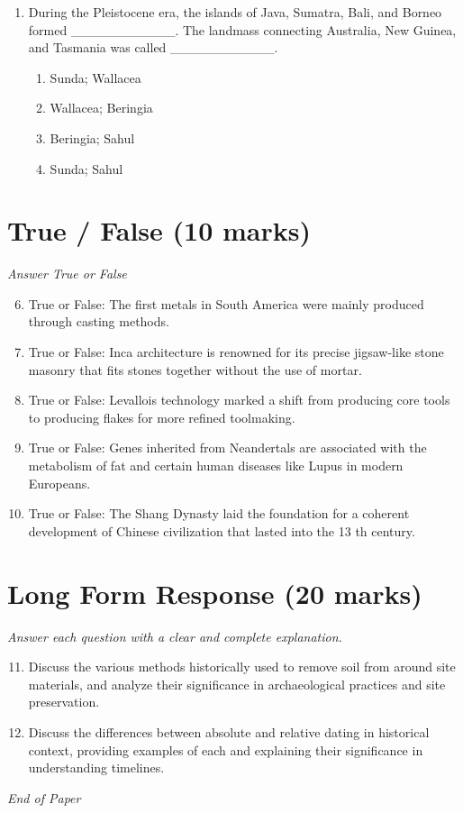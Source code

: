 \documentclass[12pt]{article}
\begin{document}
\begin{enumerate}[label=\arabic*.]
\begin{enumerate}[label=(\alph*)]
    \item 600,000 to 30,000 years ago.
    \item 400,000 to 10,000 years ago.
    \item 100,000 to 10,000 years ago.
\end{enumerate}
\item During the Pleistocene era, the islands of Java, Sumatra, Bali, and Borneo formed \_\_\_\_\_\_\_\_\_\_\_. The landmass connecting Australia, New Guinea, and Tasmania was called \_\_\_\_\_\_\_\_\_\_\_.
\begin{enumerate}[label=(\alph*)]
    \item Sunda; Wallacea
    \item Wallacea; Beringia
    \item Beringia; Sahul
    \item Sunda; Sahul
\end{enumerate}
\end{enumerate}

\section*{True / False (10 marks)}
\textit{Answer True or False}
\begin{enumerate}[label=\arabic*.]
\setcounter{enumi}{5}
\item True or False: The first metals in South America were mainly produced through casting methods.
\item True or False: Inca architecture is renowned for its precise jigsaw-like stone masonry that fits stones together without the use of mortar.
\item True or False: Levallois technology marked a shift from producing core tools to producing flakes for more refined toolmaking.
\item True or False: Genes inherited from Neandertals are associated with the metabolism of fat and certain human diseases like Lupus in modern Europeans.
\item True or False: The Shang Dynasty laid the foundation for a coherent development of Chinese civilization that lasted into the 13 th century.
\end{enumerate}

\section*{Long Form Response (20 marks)}
\textit{Answer each question with a clear and complete explanation.}
\begin{enumerate}[label=\arabic*.]
\setcounter{enumi}{10}
\item Discuss the various methods historically used to remove soil from around site materials, and analyze their significance in archaeological practices and site preservation.
\item Discuss the differences between absolute and relative dating in historical context, providing examples of each and explaining their significance in understanding timelines.
\end{enumerate}

\vfill
\noindent\textit{End of Paper}
\end{document}
